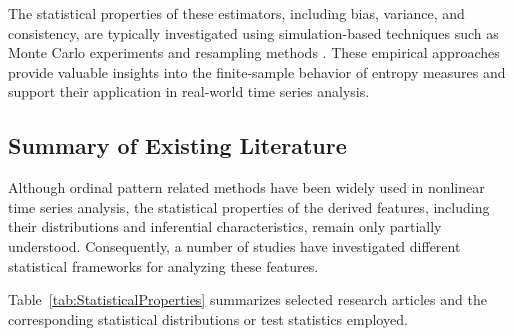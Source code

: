 \documentclass[12pt,a4paper]{article}
\begin{document}
The statistical properties of these estimators, including bias, variance, and consistency, are typically investigated using simulation-based techniques such as Monte Carlo experiments and resampling methods \cite{Amigo2012}. These empirical approaches provide valuable insights into the finite-sample behavior of entropy measures and support their application in real-world time series analysis.

\subsection{Summary of Existing Literature}

Although ordinal pattern related methods have been widely used in nonlinear time series analysis, the statistical properties of the derived features, including their distributions and inferential characteristics, remain only partially understood. Consequently, a number of studies have investigated different statistical frameworks for analyzing these features.

Table~\ref{tab:StatisticalProperties} summarizes selected research articles and the corresponding statistical distributions or test statistics employed.
\end{document}
